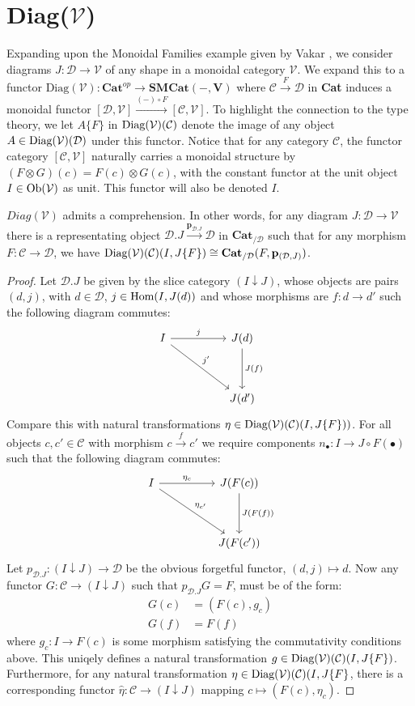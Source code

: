 \section{Diag($\mathcal{V}$)}
Expanding upon the Monoidal Families example given by Vakar \cite{vakar14}, we consider diagrams $J : \mathcal{D} \to \mathcal{V}$ of any shape in a monoidal category $\mathcal{V}$. We expand this to a functor $\text{Diag}(\mathcal{V}) : \mathbf{Cat}^{op} \to \mathbf{SMCat(-,V)}$ where $\mathcal{C} \xrightarrow{F} \mathcal{D}$ in \textbf{Cat} induces a monoidal functor $[\mathcal{D}, \mathcal{V}] \xrightarrow{(-) \circ F} [\mathcal{C}, \mathcal{V}]$. To highlight the connection to the type theory, we let $A\{F\}$ in  $\operatorname{\text{Diag}}(\mathcal{V})(\mathcal{C})$ denote the image of any object $A \in \operatorname{\text{Diag}}(\mathcal{V})(\mathcal{D})$ under this functor. Notice that for any category $\mathcal{C}$, the functor category $[\mathcal{C}, \mathcal{V}]$ naturally carries a monoidal structure by $(F \otimes G)(c) = F(c) \otimes G(c)$, with the constant functor at the unit object $I \in \mathcal{\operatorname{\text{Ob}}(V)}$ as unit. This functor will also be denoted $I$.
\begin{thm}
$Diag(\mathcal{V})$ admits a comprehension. In other words, for any diagram $J : \mathcal{D} \to \mathcal{V}$ there is a representating object $\mathcal{D}.J \xrightarrow{\mathbf{p}_{\mathcal{D}.J}} \mathcal{D}$ in $\mathbf{Cat}_{/\mathcal{D}}$ such that for any morphism $F : \mathcal{C} \to \mathcal{D}$, we have $\operatorname{\text{Diag}}(\mathcal{V})(\mathcal{C})(I, J\{F\}) \cong \mathbf{Cat}_{/\mathcal{D}}(F, \mathbf{p}_{(\mathcal{D}, J)})$.
\begin{proof}
Let $\mathcal{D}.J$ be given by the slice category $(I \downarrow J)$, whose objects are pairs $(d, j)$, with $d \in \mathcal{D}$, $j \in \operatorname{\text{Hom}}(I,J(d))$ and whose morphisms are $f : d \to d'$ such the following diagram commutes:
\[
\ti
I \ar[r, "j"] \ar[rd, "j'"] & J(d) \ar[d,"J(f)"]\\
& J(d')
\kz
\]
Compare this with natural transformations $\eta \in \operatorname{\text{Diag}}(\mathcal{V})(\mathcal{C})(I, J\{F\}))$. For all objects $c, c' \in \mathcal{C}$ with morphism $c \xrightarrow{f} c'$ we require components $n_{\bullet} : I \to J \circ F(\bullet)$ such that the following diagram commutes:
\[
\ti
I \ar[r, "\eta_c"] \ar[rd, "\eta_{c'}"] & J(F(c)) \ar[d,"J(F(f))"]\\
& J(F(c'))
\kz
\]
Let $p_{\mathcal{D}.J} : (I \downarrow J) \to \mathcal{D}$ be the obvious forgetful functor, $(d, j) \mapsto d$. Now any functor $G : \mathcal{C} \to (I \downarrow J)$ such that $p_{\mathcal{D}.J}G = F$, must be of the form:
\[
\begin{split}
G(c) &= (F(c), g_c)\\
G(f) &= F(f)
\end{split}
\]
where $g_c : I \to F(c)$ is some morphism satisfying the commutativity conditions above. This uniqely defines a natural transformation $g \in \operatorname{\text{Diag}}(\mathcal{V})(\mathcal{C})(I, J\{F\})$. Furthermore, for any natural transformation $\eta \in \operatorname{\text{Diag}}(\mathcal{V})(\mathcal{C})(I, J\{F\}$, there is a corresponding functor $\hat \eta : \mathcal{C} \to (I \downarrow J)$ mapping $c \mapsto (F(c), \eta_c)$.
\end{proof}
\end{thm}
